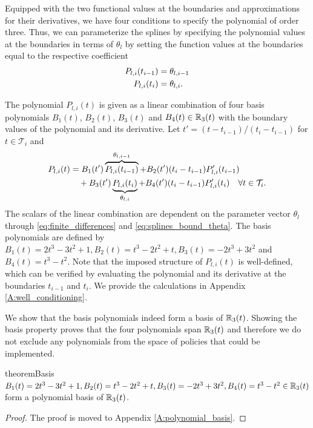 Equipped with the two functional values at the boundaries and approximations for their derivatives, we have four conditions to specify the polynomial of order three. Thus, we can parameterize the splines by specifying the polynomial values at the boundaries in terms of $\theta_l$ by setting the function values at the boundaries equal to the respective coefficient 
\begin{align}
\label{eq:splines_bound_theta}
P_{l,i}(t_{i-1}) &= \theta_{l, i-1} \\
P_{l,i}(t_{i}) &= \theta_{l,i} \notag.
\end{align}

The polynomial $P_{l,i}(t) $ is given as a linear combination of four basis polynomials  $B_1(t)$, $B_2(t)$, $B_3(t)$ and $B_4(t) \in \mathbb{R}_3(t)$ with the boundary values of the polynomial and its derivative. Let $t' = (t-t_{i-1})/(t_{i} - t_{i-1})$ for $t \in \mathcal{T}_i$ and
\begin{align}
P_{l,i}(t) &= B_1(t') \overbrace{P_{l,i}(t_{i-1})}^{\theta_{l,i-1}} + B_2(t') (t_{i} - t_{i-1}) P'_{l,i}(t_{i-1})  \\& \quad + B_3(t') \underbrace{P_{l,i}(t_{i})}_{\theta_{l,i}} + B_4(t') (t_{i} - t_{i-1}) P'_{l,i}(t_{i}) \quad \forall t \in \mathcal{T}_i. \notag
\end{align}
The scalars of the linear combination are dependent on the parameter vector $\theta_l$ through \eqref{eq:finite_differences} and \eqref{eq:splines_bound_theta}. The basis polynomials are defined by $B_1(t) = 2t^3 - 3t^2 +1, B_2(t) = t^3 - 2t^2 +t, B_3(t) = -2t^3 + 3t^2$ and $B_4(t) = t^3 - t^2$. Note that the imposed structure of $P_{l,i}(t)$ is well-defined, which can be verified by evaluating the polynomial and its derivative at the boundaries $t_{i-1}$ and $t_i$. We provide the calculations in Appendix \ref{A:well_conditioning}.

We show that the basis polynomials indeed form a basis of $\mathbb{R}_3(t)$. Showing the basis property proves that the four polynomials span $\mathbb{R}_3(t)$ and therefore we do not exclude any polynomials from the space of policies that could be implemented.
\begin{restatable}{theorem}{Basis}
$B_1(t) = 2t^3 - 3t^2 +1, B_2(t) = t^3 - 2t^2 +t, B_3(t) = -2t^3 + 3t^2, B_4(t) = t^3 - t^2 \in \mathbb{R}_3(t)$ form a polynomial basis of $\mathbb{R}_3(t)$.
\end{restatable}
\begin{proof}
The proof is moved to Appendix \ref{A:polynomial_basis}.
\end{proof} 


 
